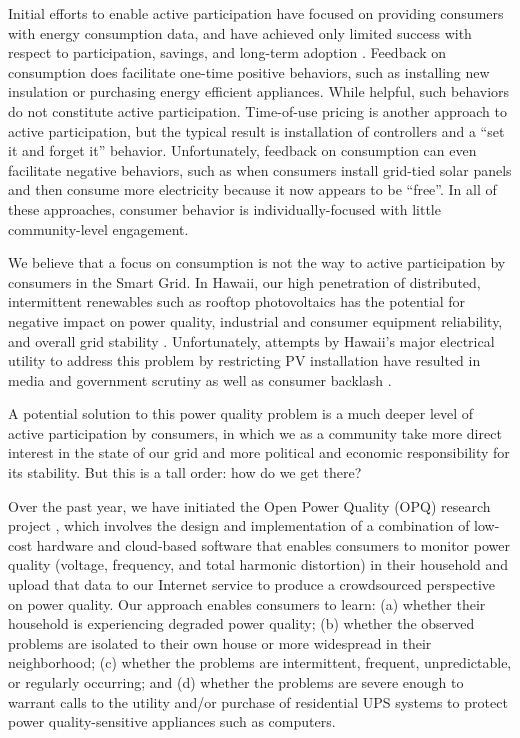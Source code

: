 Initial efforts to enable active participation have focused on providing consumers with energy consumption data, and have achieved only limited success with respect to participation, savings, and long-term adoption \cite{Darby06,Faruqui09,Foster2012}.  Feedback on consumption does facilitate one-time positive behaviors, such as installing new insulation or purchasing energy efficient appliances. While helpful, such behaviors do not constitute active participation.    Time-of-use pricing is another approach to active participation, but the typical result is installation of controllers and a ``set it and forget it'' behavior.  Unfortunately, feedback on consumption can even facilitate negative behaviors, such as when consumers install grid-tied solar panels and then consume more electricity because it now appears to be ``free''.  In all of these approaches, consumer behavior is individually-focused with little community-level engagement.

We believe that a focus on consumption is not the way to active participation by consumers in the Smart Grid.  In Hawaii, our high penetration of distributed, intermittent renewables such as rooftop photovoltaics has the potential for negative impact on power quality, industrial and consumer equipment reliability, and overall grid stability \cite{Rodriguez2010,Laskar2012}. Unfortunately, attempts by Hawaii's major electrical utility to address this problem by restricting PV installation have resulted in media and government scrutiny as well as consumer backlash \cite{Yonan2013,Zunin2013,Elston2013,Cocke2013,Cocke2012}.

A potential solution to this power quality problem is a much deeper level of active participation by consumers, in which we as a community take more direct interest in the state of our grid and more political and economic responsibility for its stability.  But this is a tall order: how do we get there?

Over the past year, we have initiated the Open Power Quality (OPQ) research project \cite{opq-site}, which involves the design and implementation of a combination of low-cost hardware and cloud-based software that enables consumers to monitor power quality (voltage, frequency, and total harmonic distortion) in their household and upload that data to our Internet service to produce a crowdsourced perspective on power quality.  Our approach enables consumers to learn: (a) whether their household is experiencing degraded power quality; (b) whether the observed problems are isolated to their own house or more widespread in their neighborhood;  (c) whether the problems are intermittent, frequent, unpredictable, or regularly occurring;  and (d) whether the problems are severe enough to warrant calls to the utility and/or purchase of residential UPS systems to protect power quality-sensitive appliances such as computers. 

